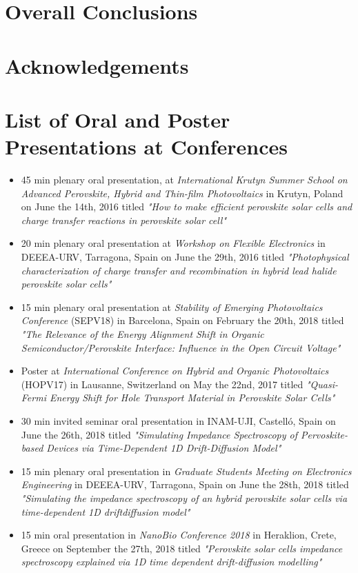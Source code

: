 \documentclass[b5paper, 12pt, openright]{book} %
\begin{document}
\backmatter

\chapter{Overall Conclusions}\label{ch:conclusions}
%



\chapter{Acknowledgements}
%

	\printindex

\chapter{List of Oral and Poster Presentations at Conferences}
	\begin{itemize}
		\item 45 min plenary oral presentation, at \textit{International Krutyn Summer School on Advanced Perovskite, Hybrid and Thin-film Photovoltaics} in Krutyn, Poland on June the 14th, 2016 titled \textit{"How to make efficient perovskite solar cells and charge transfer reactions in perovskite solar cell"}
		\item 20 min plenary oral presentation at \textit{Workshop on Flexible Electronics} in DEEEA-URV, Tarragona, Spain on June the 29th, 2016 titled \textit{"Photophysical characterization of charge transfer and recombination in hybrid lead halide perovskite solar cells"}
		\item 15 min plenary oral presentation at \textit{Stability of Emerging Photovoltaics Conference} (SEPV18) in Barcelona, Spain on February the 20th, 2018 titled \textit{"The Relevance of the Energy Alignment Shift in Organic Semiconductor/Perovskite Interface: Influence in the Open Circuit Voltage"}
		\item Poster at \textit{International Conference on Hybrid and Organic Photovoltaics} (HOPV17) in Lausanne, Switzerland on May the 22nd, 2017 titled \textit{"Quasi-Fermi Energy Shift for Hole Transport Material in Perovskite Solar Cells"}
		\item 30 min invited seminar oral presentation in INAM-UJI, Castelló, Spain on June the 26th, 2018 titled \textit{"Simulating Impedance Spectroscopy of Pervoskite-based Devices via Time-Dependent 1D Drift-Diffusion Model"}
		\item 15 min plenary oral presentation in \textit{Graduate Students Meeting on Electronics Engineering} in DEEEA-URV, Tarragona, Spain on June the 28th, 2018 titled \textit{"Simulating the impedance spectroscopy of an hybrid perovskite solar cells via time-dependent 1D driftdiffusion model"}
		\item 15 min oral presentation in \textit{NanoBio Conference 2018} in Heraklion, Crete, Greece on September the 27th, 2018 titled \textit{"Perovskite solar cells impedance spectroscopy explained via 1D time dependent drift-diffusion modelling"}
	\end{itemize}

	\printbibliography[category=mypapers, heading=bibintoc, title={Contributions to Scientific Literature}]

	\printbibliography[notcategory=mypapers,heading=bibintoc]
\end{document}
